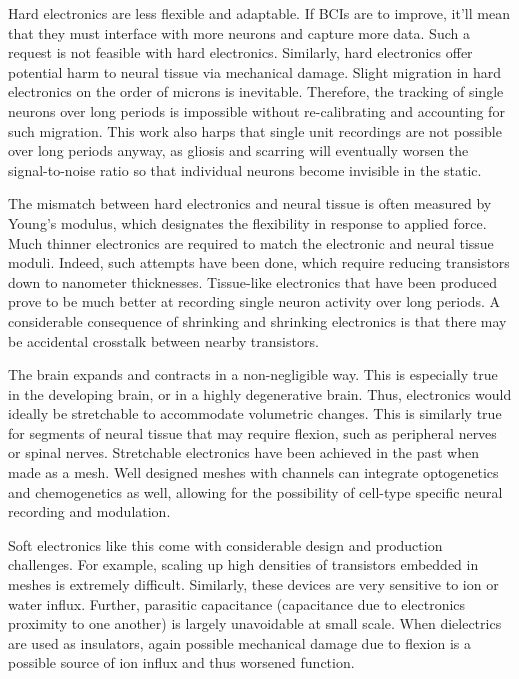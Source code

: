 Hard electronics are less flexible and adaptable. If BCIs are to improve, it'll mean that they must interface with more neurons and capture more data. Such a request is not feasible with hard electronics. Similarly, hard electronics offer potential harm to neural tissue via mechanical damage. Slight migration in hard electronics on the order of microns is inevitable. Therefore, the tracking of single neurons over long periods is impossible without re-calibrating and accounting for such migration. This work also harps that single unit recordings are not possible over long periods anyway, as gliosis and scarring will eventually worsen the signal-to-noise ratio so that individual neurons become invisible in the static.\newline

The mismatch between hard electronics and neural tissue is often measured by Young's modulus, which designates the flexibility in response to applied force. Much thinner electronics are required to match the electronic and neural tissue moduli. Indeed, such attempts have been done, which require reducing transistors down to nanometer thicknesses. Tissue-like electronics that have been produced prove to be much better at recording single neuron activity over long periods. A considerable consequence of shrinking and shrinking electronics is that there may be accidental crosstalk between nearby transistors. \newline

The brain expands and contracts in a non-negligible way. This is especially true in the developing brain, or in a highly degenerative brain. Thus, electronics would ideally be stretchable to accommodate volumetric changes. This is similarly true for segments of neural tissue that may require flexion, such as peripheral nerves or spinal nerves. Stretchable electronics have been achieved in the past when made as a mesh. Well designed meshes with channels can integrate optogenetics and chemogenetics as well, allowing for the possibility of cell-type specific neural recording and modulation.\newline

Soft electronics like this come with considerable design and production challenges. For example, scaling up high densities of transistors embedded in meshes is extremely difficult. Similarly, these devices are very sensitive to ion or water influx. Further, parasitic capacitance (capacitance due to electronics proximity to one another) is largely unavoidable at small scale. When dielectrics are used as insulators, again possible mechanical damage due to flexion is a possible source of ion influx and thus worsened function. 


